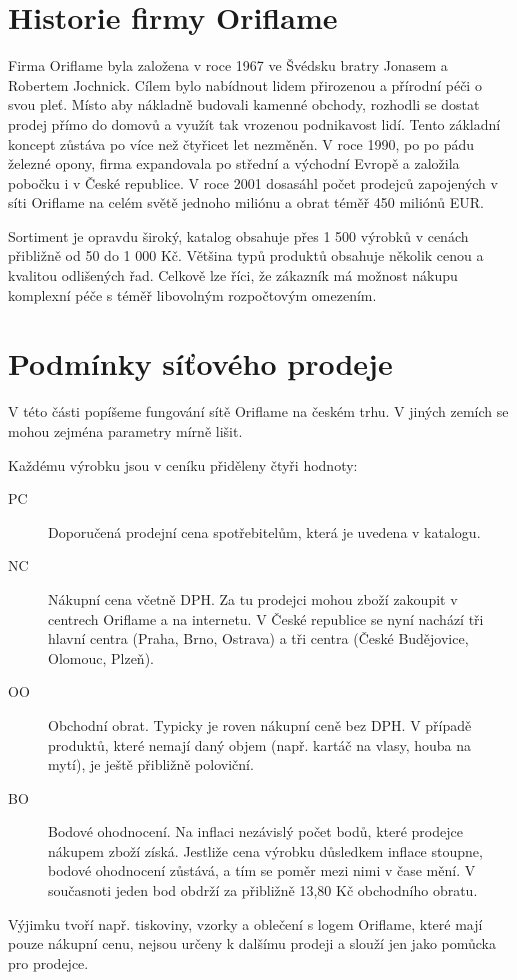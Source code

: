 \documentclass[a4wide,12pt]{report}
\begin{document}
\section{Historie firmy Oriflame}
Firma Oriflame byla založena v roce 1967 ve Švédsku bratry Jonasem a Robertem Jochnick. Cílem bylo nabídnout lidem přirozenou a přírodní péči o svou pleť. Místo aby nákladně budovali kamenné obchody, rozhodli se dostat prodej přímo do domovů a využít tak vrozenou podnikavost lidí. Tento základní koncept zůstáva po více než čtyřicet let nezměněn. V roce 1990, po po pádu železné opony, firma expandovala po střední a východní Evropě a založila pobočku i v České republice. V roce 2001 dosasáhl počet prodejců zapojených v síti Oriflame na celém světě jednoho miliónu a obrat téměř 450 miliónů EUR.

Sortiment je opravdu široký, katalog obsahuje přes 1 500 výrobků v cenách přibližně od 50 do 1 000 Kč. Většina typů produktů obsahuje několik cenou a kvalitou odlišených řad. Celkově lze říci, že zákazník má možnost nákupu komplexní péče s téměř libovolným rozpočtovým omezením.
\section{Podmínky síťového prodeje}
V této části popíšeme fungování sítě Oriflame na českém trhu. V jiných zemích se mohou zejména parametry mírně lišit.

Každému výrobku jsou v ceníku přiděleny čtyři hodnoty:
\begin{description}
\item[PC] Doporučená prodejní cena spotřebitelům, která je uvedena v katalogu.
\item[NC] Nákupní cena včetně DPH. Za tu prodejci mohou zboží zakoupit v centrech Oriflame a na internetu. V České republice se nyní nachází tři hlavní centra (Praha, Brno, Ostrava) a tři centra (České Budějovice, Olomouc, Plzeň).
\item[OO] Obchodní obrat. Typicky je roven nákupní ceně bez DPH. V případě produktů, které nemají daný objem (např. kartáč na vlasy, houba na mytí), je ještě přibližně poloviční.
\item[BO] Bodové ohodnocení. Na inflaci nezávislý počet bodů, které prodejce nákupem zboží získá. Jestliže cena výrobku důsledkem inflace stoupne, bodové ohodnocení zůstává, a tím se poměr mezi nimi v čase mění. V současnoti jeden bod obdrží za přibližně 13,80 Kč obchodního obratu.
\end{description}
Výjimku tvoří např. tiskoviny, vzorky a oblečení s logem Oriflame, které mají pouze nákupní cenu,  nejsou určeny k dalšímu prodeji a slouží jen jako pomůcka pro prodejce.
\end{document}
